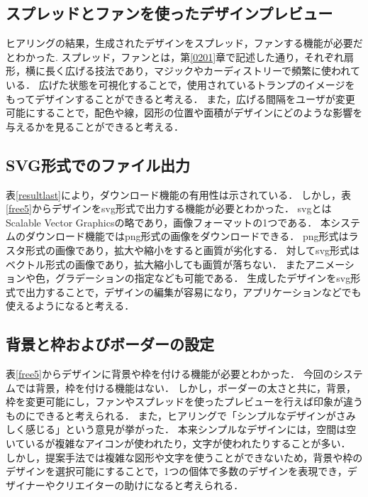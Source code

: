 \subsection{スプレッドとファンを使ったデザインプレビュー}
ヒアリングの結果，生成されたデザインをスプレッド，ファンする機能が必要だとわかった.
スプレッド，ファンとは，第\ref{0201}章で記述した通り，それぞれ扇形，横に長く広げる技法であり，マジックやカーディストリーで頻繁に使われている．
広げた状態を可視化することで，使用されているトランプのイメージをもってデザインすることができると考える．
また，広げる間隔をユーザが変更可能にすることで，配色や線，図形の位置や面積がデザインにどのような影響を与えるかを見ることができると考える．

\subsection{SVG形式でのファイル出力}
表\ref{resultlast}により，ダウンロード機能の有用性は示されている．
しかし，表\ref{free5}からデザインをsvg形式で出力する機能が必要とわかった．
svgとはScalable Vector Graphicsの略であり，画像フォーマットの1つである．
本システムのダウンロード機能ではpng形式の画像をダウンロードできる．
png形式はラスタ形式の画像であり，拡大や縮小をすると画質が劣化する．
対してsvg形式はベクトル形式の画像であり，拡大縮小しても画質が落ちない．
またアニメーションや色，グラデーションの指定なども可能である．
生成したデザインをsvg形式で出力することで，デザインの編集が容易になり，アプリケーションなどでも使えるようになると考える．

\subsection{背景と枠およびボーダーの設定}
表\ref{free5}からデザインに背景や枠を付ける機能が必要とわかった．
今回のシステムでは背景，枠を付ける機能はない．
しかし，ボーダーの太さと共に，背景，枠を変更可能にし，ファンやスプレッドを使ったプレビューを行えば印象が違うものにできると考えられる．
また，ヒアリングで「シンプルなデザインがさみしく感じる」という意見が挙がった．
本来シンプルなデザインには，空間は空いているが複雑なアイコンが使われたり，文字が使われたりすることが多い．
しかし，提案手法では複雑な図形や文字を使うことができないため，背景や枠のデザインを選択可能にすることで，1つの個体で多数のデザインを表現でき，デザイナーやクリエイターの助けになると考えられる．

